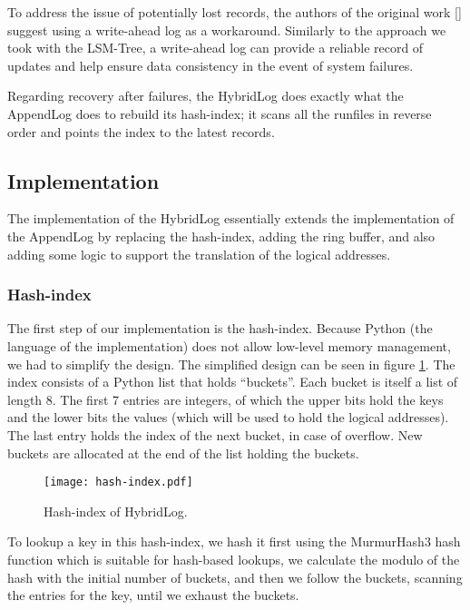 To address the issue of potentially lost records, the authors of the original work [\cite{faster}] suggest using a write-ahead log as a workaround.
Similarly to the approach we took with the LSM-Tree, a write-ahead log can provide a reliable record of updates and help ensure data consistency in the event of system failures.

Regarding recovery after failures, the HybridLog does exactly what the AppendLog does to rebuild its hash-index; it scans all the runfiles in reverse order and points the index to the latest records.

\subsection{Implementation}

The implementation of the HybridLog essentially extends the implementation of the AppendLog by replacing the hash-index, adding the ring buffer, and also adding some logic to support the translation of the logical addresses.

\subsubsection{Hash-index}

The first step of our implementation is the hash-index. Because Python (the language of the implementation) does not allow low-level memory management, we had to simplify the design.
The simplified design can be seen in figure \ref{fig:hash-index}.
The index consists of a Python list that holds ``buckets''.
Each bucket is itself a list of length 8. The first 7 entries are integers, of which the upper bits hold the keys and the lower bits the values (which will be used to hold the logical addresses). The last entry holds the index of the next bucket, in case of overflow.
New buckets are allocated at the end of the list holding the buckets.

\begin{figure}[h]
    \centering
    \texttt{[image: hash-index.pdf]}
    \caption{Hash-index of HybridLog.}
    \label{fig:hash-index}
\end{figure}

To lookup a key in this hash-index, we hash it first using the MurmurHash3 hash function which is suitable for hash-based lookups, we calculate the modulo of the hash with the initial number of buckets, and then we follow the buckets, scanning the entries for the key, until we exhaust the buckets.

